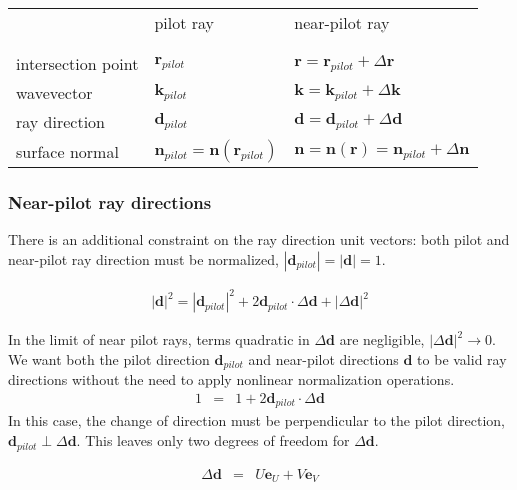 \documentclass[12pt,a4paper,twoside,openright,BCOR10mm,headsepline,titlepage,abstracton,chapterprefix,final]{scrreprt}
\newcommand\Vector[1]{{\mathbf{#1}}}
\newcommand\wavenumber{k}
\newcommand\Wavevector{\Vector{\wavenumber}}
\begin{document}
\begin{tabular}{ l | l | l }
		    & pilot ray & near-pilot ray \\
& & \\ \hline & & \\
intersection point  & $\Vector{r}_{pilot}$ & ${\Vector{r}} = \Vector{r}_{pilot} + \Delta\Vector{r}$ \\
wavevector  & $\Wavevector_{pilot}$ & ${\Wavevector} = \Wavevector_{pilot} + \Delta\Wavevector$ \\
ray direction  & $\Vector{d}_{pilot}$ & ${\Vector{d}} = \Vector{d}_{pilot} + \Delta\Vector{d}$ \\
surface normal      & $\Vector{n}_{pilot} = \Vector{n}(\Vector{r}_{pilot})$ & ${\Vector{n}} = \Vector{n}({\Vector{r}}) = \Vector{n}_{pilot} + \Delta\Vector{n}$ \\
\end{tabular}

\subsubsection{Near-pilot ray directions}

There is an additional constraint on the ray direction unit vectors: both pilot and near-pilot ray direction must be normalized,
$|\Vector{d}_{pilot}|=|{\Vector{d}}|=1$.

\begin{eqnarray}
 |{\Vector{d}}|^2 = |\Vector{d}_{pilot}|^2 + 2 \Vector{d}_{pilot} \cdot \Delta\Vector{d} + |\Delta\Vector{d}|^2
\end{eqnarray}

In the limit of near pilot rays, terms quadratic in $\Delta\Vector{d}$ are negligible, $|\Delta\Vector{d}|^2 \rightarrow 0$. 
We want both the pilot direction $\Vector{d}_{pilot}$ and near-pilot directions ${\Vector{d}}$ to be valid ray directions 
without the need to apply nonlinear normalization operations.
\begin{eqnarray}
1 &=& 1 + 2 \Vector{d}_{pilot} \cdot \Delta\Vector{d}
\end{eqnarray}
In this case, the change of direction must be perpendicular to the pilot direction, $\Vector{d}_{pilot} \perp \Delta\Vector{d}$. 
This leaves only two degrees of freedom for $\Delta\Vector{d}$.

\begin{eqnarray}
 \Delta\Vector{d} &=& U \Vector{e}_{U} + V \Vector{e}_{V}
\end{eqnarray}
\end{document}
